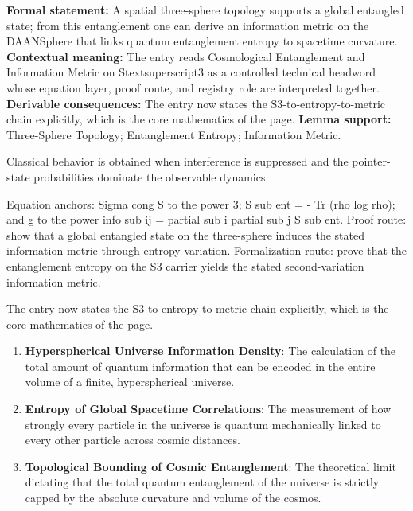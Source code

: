 \begingroup\footnotesize\setlength{\emergencystretch}{3em}\sloppy
\textbf{Formal statement:} A spatial three-sphere topology supports a global entangled state; from this entanglement one can derive an information metric on the DAANSphere that links quantum entanglement entropy to spacetime curvature. \textbf{Contextual meaning:} The entry reads Cosmological Entanglement and Information Metric on Stextsuperscript3 as a controlled technical headword whose equation layer, proof route, and registry role are interpreted together. \textbf{Derivable consequences:} The entry now states the S3-to-entropy-to-metric chain explicitly, which is the core mathematics of the page. \textbf{Lemma support:} Three-Sphere Topology; Entanglement Entropy; Information Metric.\par
\endgroup

Classical behavior is obtained when interference is suppressed and the pointer-state probabilities dominate the observable dynamics.

Equation anchors: Sigma cong S to the power 3; S sub ent = - Tr (rho log rho); and g to the power info sub ij = partial sub i partial sub j S sub ent. Proof route: show that a global entangled state on the three-sphere induces the stated information metric through entropy variation. Formalization route: prove that the entanglement entropy on the S3 carrier yields the stated second-variation information metric.

The entry now states the S3-to-entropy-to-metric chain explicitly, which is the core mathematics of the page.
\endgroup

\begin{enumerate}[leftmargin=1.6em,itemsep=6pt,topsep=4pt]
\item \textbf{Hyperspherical Universe Information Density}: The calculation of the total amount of quantum information that can be encoded in the entire volume of a finite, hyperspherical universe.
\item \textbf{Entropy of Global Spacetime Correlations}: The measurement of how strongly every particle in the universe is quantum mechanically linked to every other particle across cosmic distances.
\item \textbf{Topological Bounding of Cosmic Entanglement}: The theoretical limit dictating that the total quantum entanglement of the universe is strictly capped by the absolute curvature and volume of the cosmos.
\end{enumerate}

